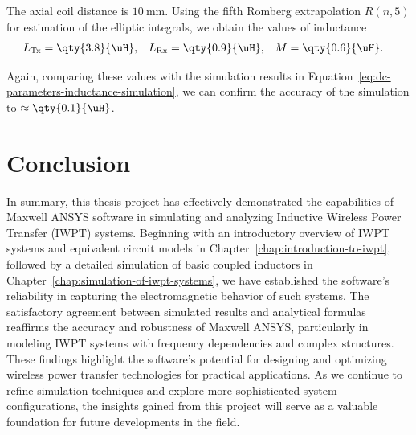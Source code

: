 \documentclass[11pt,a4paper,twoside,openany]{report}
\newcommand{\Tx}{\mathrm{Tx}}
\newcommand{\Rx}{\mathrm{Rx}}
\begin{document}
            The axial coil distance is $\qty{10}{\mm}$. Using the fifth Romberg extrapolation $R(n,5)$ for estimation of the elliptic integrals, we obtain the values of inductance
            \begin{align}
                \label{eq:dc-parameters-inductance-analytical}
                L_{\Tx} &= \qty{3.8}{\uH},
            &
                L_{\Rx} &= \qty{0.9}{\uH},
            &
                M &= \qty{0.6}{\uH}.
            \end{align}

            Again, comparing these values with the simulation results in Equation~\ref{eq:dc-parameters-inductance-simulation}, we can confirm the accuracy of the simulation to $\approx\qty{0.1}{\uH}$.

    
    \chapter*{Conclusion}
    \label{chap:conclusion}
    
    In summary, this thesis project has effectively demonstrated the capabilities of Maxwell ANSYS software in simulating and analyzing Inductive Wireless Power Transfer (IWPT) systems. Beginning with an introductory overview of IWPT systems and equivalent circuit models in Chapter~\ref{chap:introduction-to-iwpt}, followed by a detailed simulation of basic coupled inductors in Chapter~\ref{chap:simulation-of-iwpt-systems}, we have established the software's reliability in capturing the electromagnetic behavior of such systems. The satisfactory agreement between simulated results and analytical formulas reaffirms the accuracy and robustness of Maxwell ANSYS, particularly in modeling IWPT systems with frequency dependencies and complex structures. These findings highlight the software's potential for designing and optimizing wireless power transfer technologies for practical applications. As we continue to refine simulation techniques and explore more sophisticated system configurations, the insights gained from this project will serve as a valuable foundation for future developments in the field.

    
	
\end{document}
